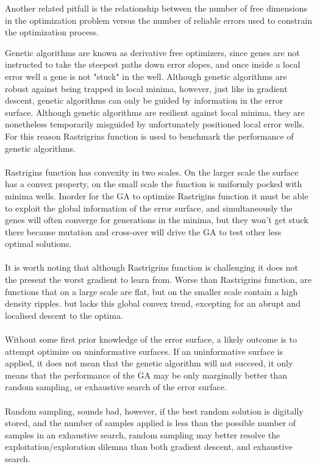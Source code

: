    Another related pitfall is the relationship between the number of free dimensions in the optimization problem versus the number of reliable errors used to constrain the optimization process.
   
   Genetic algorithms are known as derivative free optimizers, since genes are not instructed to take the steepest paths down error slopes, and once inside a local error well a gene is not "stuck" in the well. Although genetic algorithms are robust against being trapped in local minima, however, just like in gradient descent, genetic algorithms can only be guided by information in the error surface. Although genetic algorithms are resilient against local minima, they are nonetheless temporarily misguided by unfortunately positioned local error wells. For this reason Rastrigrins function is used to benchmark the performance of genetic algorithms.\\
   \\
   Rastrigins function has convexity in two scales. On the larger scale the surface has a convex property, on the small scale the function is uniformly pocked with minima wells. Inorder for the GA to optimize Rastrigins function it must be able to exploit the global information of the error surface, and simultaneously the genes will often converge for generations in the minima, but they won't get stuck there because mutation and cross-over will drive the GA to test other less optimal solutions.\\
   \\
   
   It is worth noting that although Rastrigrins function is challenging it does not the present the worst gradient to learn from. Worse than Rastrigrins function, are functions that on a large scale are flat, but on the smaller scale contain a high density ripples.
   but lacks this global convex trend, excepting for an abrupt and localised descent to the optima.\\ 
   \\
   Without some first prior knowledge of the error surface, a likely outcome is to attempt optimize on uninformative surfaces. If an uninformative surface is applied, it does not mean that the genetic algorithm will not succeed, it only means that the performance of the GA may be only marginally better than random sampling, or exhaustive search of the error surface.\\
   \\
   Random sampling, sounds bad, however, if the best random solution is digitally stored, and the number of samples applied is less than the possible number of samples in an exhaustive search, random sampling may better resolve the exploitation/exploration dilemna than both gradient descent, and exhaustive search.
{ \hspace*{\fill} \\}      

